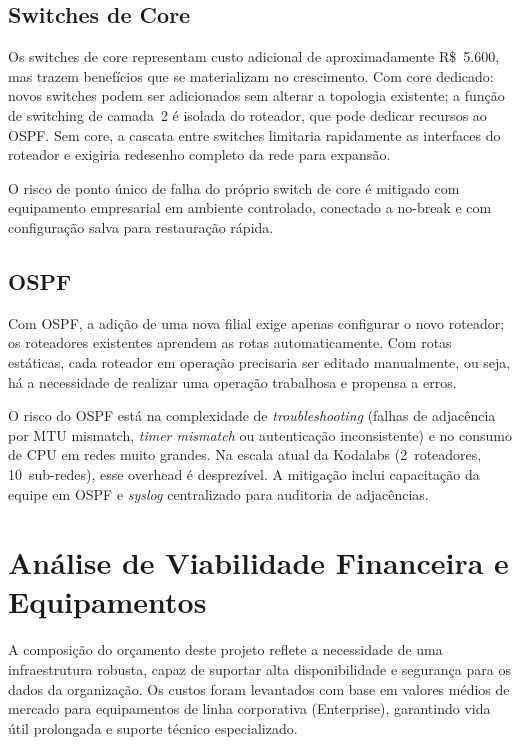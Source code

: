 \documentclass[12pt,a4paper]{article}
\begin{document}
\subsection{Switches de Core}
Os switches de core representam custo adicional de aproximadamente R\$~5.600, mas
trazem benefícios que se materializam no crescimento. Com core dedicado: novos
switches podem ser adicionados sem alterar a topologia existente; a função de
switching de camada~2 é isolada do roteador, que pode dedicar recursos ao OSPF.
Sem core, a cascata entre switches limitaria rapidamente as interfaces do
roteador e exigiria redesenho completo da rede para expansão.

O risco de ponto único de falha do próprio switch de core é mitigado com
equipamento empresarial em ambiente controlado, conectado a no-break e com
configuração salva para restauração rápida.

\subsection{OSPF}

Com OSPF, a adição de uma nova filial exige apenas configurar o novo roteador; os
roteadores existentes aprendem as rotas automaticamente. Com rotas estáticas, cada
roteador em operação precisaria ser editado manualmente, ou seja, há a necessidade de realizar uma operação trabalhosa e
propensa a erros. 

O risco do OSPF está na complexidade de \textit{troubleshooting}
(falhas de adjacência por MTU mismatch, \textit{timer mismatch} ou autenticação
inconsistente) e no consumo de CPU em redes muito grandes. Na escala atual da
Kodalabs (2~roteadores, 10~sub-redes), esse overhead é desprezível. A
mitigação inclui capacitação da equipe em OSPF e \textit{syslog} centralizado para
auditoria de adjacências.



\section{Análise de Viabilidade Financeira e Equipamentos}

A composição do orçamento deste projeto reflete a necessidade de uma infraestrutura robusta, capaz de suportar alta disponibilidade e segurança para os dados da organização. Os custos foram levantados com base em valores médios de mercado para equipamentos de linha corporativa (Enterprise), garantindo vida útil prolongada e suporte técnico especializado.
\end{document}
